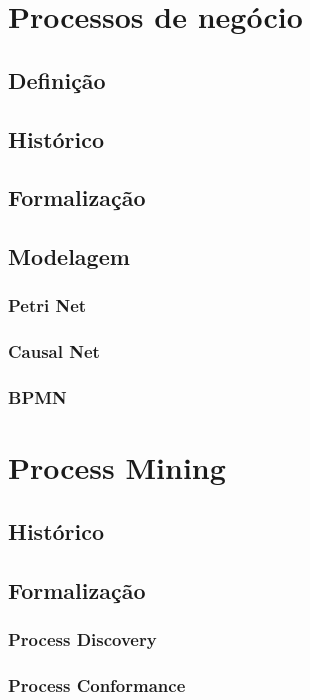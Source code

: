 \documentclass[a4paper]{article}
\begin{document}
\section{Processos de negócio}

\subsection{Definição}

\subsection{Histórico}

\subsection{Formalização}

\subsection{Modelagem}
	
\subsubsection{Petri Net}
\subsubsection{Causal Net}
\subsubsection{BPMN}

\section{Process Mining}

\subsection{Histórico}

\subsection{Formalização}
\subsubsection{Process Discovery}
\subsubsection{Process Conformance}
\end{document}
